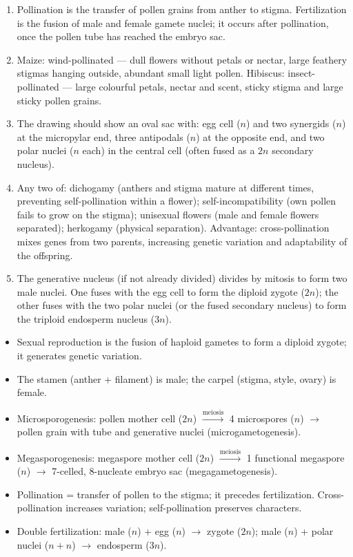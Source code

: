 \documentclass[11pt]{article}
\begin{document}
\begin{corrige}[Exercise 1]
\begin{enumerate}
\item Pollination is the transfer of pollen grains from anther to stigma. Fertilization is the fusion of male and female gamete nuclei; it occurs after pollination, once the pollen tube has reached the embryo sac.
\item Maize: wind-pollinated --- dull flowers without petals or nectar, large feathery stigmas hanging outside, abundant small light pollen. Hibiscus: insect-pollinated --- large colourful petals, nectar and scent, sticky stigma and large sticky pollen grains.
\item The drawing should show an oval sac with: egg cell ($n$) and two synergids ($n$) at the micropylar end, three antipodals ($n$) at the opposite end, and two polar nuclei ($n$ each) in the central cell (often fused as a $2n$ secondary nucleus).
\item Any two of: dichogamy (anthers and stigma mature at different times, preventing self-pollination within a flower); self-incompatibility (own pollen fails to grow on the stigma); unisexual flowers (male and female flowers separated); herkogamy (physical separation). Advantage: cross-pollination mixes genes from two parents, increasing genetic variation and adaptability of the offspring.
\item The generative nucleus (if not already divided) divides by mitosis to form two male nuclei. One fuses with the egg cell to form the diploid zygote ($2n$); the other fuses with the two polar nuclei (or the fused secondary nucleus) to form the triploid endosperm nucleus ($3n$).
\end{enumerate}
\end{corrige}

\begin{aretenir}
\begin{itemize}
\item Sexual reproduction is the fusion of haploid gametes to form a diploid zygote; it generates genetic variation.
\item The stamen (anther + filament) is male; the carpel (stigma, style, ovary) is female.
\item Microsporogenesis: pollen mother cell ($2n$) $\xrightarrow{\text{meiosis}}$ 4 microspores ($n$) $\rightarrow$ pollen grain with tube and generative nuclei (microgametogenesis).
\item Megasporogenesis: megaspore mother cell ($2n$) $\xrightarrow{\text{meiosis}}$ 1 functional megaspore ($n$) $\rightarrow$ 7-celled, 8-nucleate embryo sac (megagametogenesis).
\item Pollination = transfer of pollen to the stigma; it precedes fertilization. Cross-pollination increases variation; self-pollination preserves characters.
\item Double fertilization: male ($n$) + egg ($n$) $\rightarrow$ zygote ($2n$); male ($n$) + polar nuclei ($n+n$) $\rightarrow$ endosperm ($3n$).
\end{itemize}
\end{aretenir}
\end{document}
